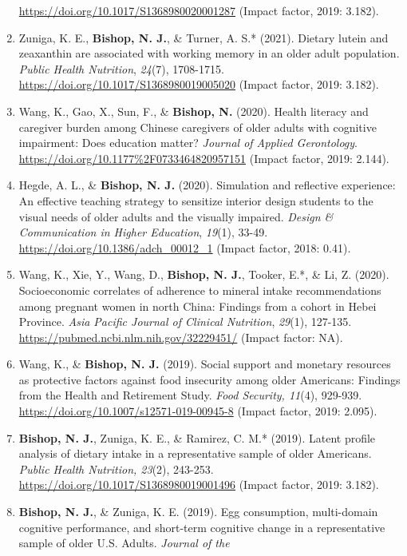 \documentclass[
]{article}
\begin{document}
\begin{enumerate}
  \url{https://doi.org/10.1017/S1368980020001287} (Impact factor, 2019:
  3.182).
\item
  Zuniga, K. E., \textbf{Bishop, N. J.}, \& Turner, A. S.* (2021).
  Dietary lutein and zeaxanthin are associated with working memory in an
  older adult population. \emph{Public Health Nutrition}, \emph{24}(7),
  1708-1715. \url{https://doi.org/10.1017/S1368980019005020} (Impact
  factor, 2019: 3.182).
\item
  Wang, K., Gao, X., Sun, F., \& \textbf{Bishop, N.} (2020). Health
  literacy and caregiver burden among Chinese caregivers of older adults
  with cognitive impairment: Does education matter? \emph{Journal of
  Applied Gerontology}.
  \url{https://doi.org/10.1177\%2F0733464820957151} (Impact factor,
  2019: 2.144).
\item
  Hegde, A. L., \& \textbf{Bishop, N. J.} (2020). Simulation and
  reflective experience: An effective teaching strategy to sensitize
  interior design students to the visual needs of older adults and the
  visually impaired. \emph{Design \& Communication in Higher Education},
  \emph{19}(1), 33-49. \url{https://doi.org/10.1386/adch_00012_1}
  (Impact factor, 2018: 0.41).
\item
  Wang, K., Xie, Y., Wang, D., \textbf{Bishop, N. J.}, Tooker, E.*, \&
  Li, Z. (2020). Socioeconomic correlates of adherence to mineral intake
  recommendations among pregnant women in north China: Findings from a
  cohort in Hebei Province. \emph{Asia Pacific Journal of Clinical
  Nutrition}, \emph{29}(1), 127-135.
  \url{https://pubmed.ncbi.nlm.nih.gov/32229451/} (Impact factor: NA).
\item
  Wang, K., \& \textbf{Bishop, N. J.} (2019). Social support and
  monetary resources as protective factors against food insecurity among
  older Americans: Findings from the Health and Retirement Study.
  \emph{Food Security, 11}(4), 929-939.
  \url{https://doi.org/10.1007/s12571-019-00945-8} (Impact factor, 2019:
  2.095).
\item
  \textbf{Bishop, N. J.}, Zuniga, K. E., \& Ramirez, C. M.* (2019).
  Latent profile analysis of dietary intake in a representative sample
  of older Americans. \emph{Public Health Nutrition, 23}(2), 243-253.
  \url{https://doi.org/10.1017/S1368980019001496} (Impact factor, 2019:
  3.182).
\item
  \textbf{Bishop, N. J.}, \& Zuniga, K. E. (2019). Egg consumption,
  multi-domain cognitive performance, and short-term cognitive change in
  a representative sample of older U.S. Adults. \emph{Journal of the
}
\end{enumerate}
\end{document}
